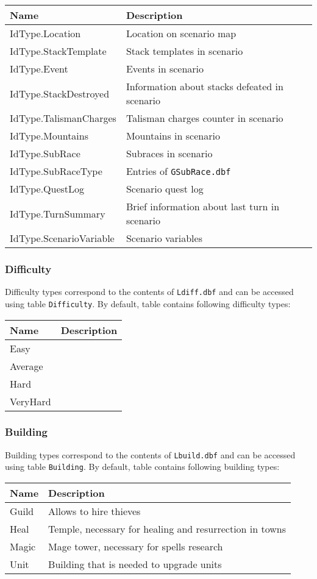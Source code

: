 \begin{tabularx}{\linewidth}{| l | X |}
\hline
\textbf{Name} & \textbf{Description} \\
\hline
IdType.Location & Location on scenario map\\
\hline
IdType.StackTemplate & Stack templates in scenario\\
\hline
IdType.Event & Events in scenario\\
\hline
IdType.StackDestroyed & Information about stacks defeated in scenario\\
\hline
IdType.TalismanCharges & Talisman charges counter in scenario\\
\hline
IdType.Mountains & Mountains in scenario\\
\hline
IdType.SubRace & Subraces in scenario\\
\hline
IdType.SubRaceType & Entries of \texttt{GSubRace.dbf}\\
\hline
IdType.QuestLog & Scenario quest log\\
\hline
IdType.TurnSummary & Brief information about last turn in scenario\\
\hline
IdType.ScenarioVariable & Scenario variables\\
\hline
\end{tabularx}

\subsubsection{Difficulty}
\label{Difficulty}
Difficulty types correspond to the contents of \texttt{Ldiff.dbf} and can be accessed using table \texttt{Difficulty}.
By default, table contains following difficulty types:\\
\begin{tabularx}{\linewidth}{| l | X |}
\hline
\textbf{Name} & \textbf{Description} \\
\hline
Easy &\\
\hline
Average &\\
\hline
Hard &\\
\hline
VeryHard &\\
\hline
\end{tabularx}

\subsubsection{Building}
\label{BuildingCategory}
Building types correspond to the contents of \texttt{Lbuild.dbf} and can be accessed using table \texttt{Building}.
By default, table contains following building types:\\
\begin{tabularx}{\linewidth}{| l | X |}
\hline
\textbf{Name} & \textbf{Description} \\
\hline
Guild & Allows to hire thieves\\
\hline
Heal & Temple, necessary for healing and resurrection in towns\\
\hline
Magic & Mage tower, necessary for spells research\\
\hline
Unit & Building that is needed to upgrade units\\
\hline
\end{tabularx}

